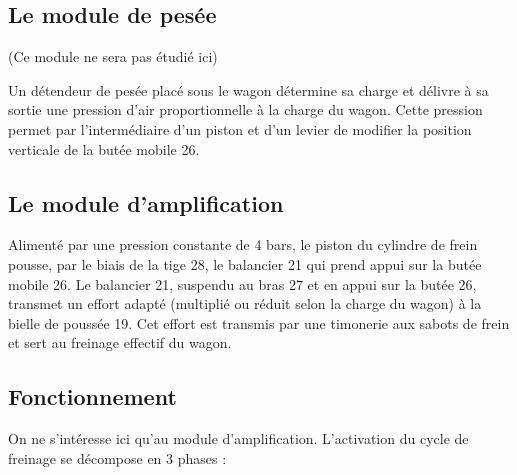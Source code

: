 \documentclass[11pt,oneside]{article}
\begin{document}
\subsection*{Le module de pesée}
(Ce module ne sera pas étudié ici)

Un détendeur de pesée placé sous le wagon détermine sa charge et délivre à sa sortie une pression d'air proportionnelle à la charge du wagon. Cette pression permet par l'intermédiaire d'un piston et d'un levier de modifier la position verticale de la butée mobile 26.

\subsection*{Le module d'amplification}
Alimenté par une pression constante de 4 bars, le piston du cylindre de frein pousse, par le biais de la tige 28, le balancier 21 qui prend appui sur la butée mobile 26. Le balancier 21, suspendu au bras 27 et en appui sur la butée 26, transmet un effort adapté (multiplié ou réduit selon la charge du wagon) à la bielle de poussée 19. Cet effort est transmis par une timonerie aux sabots de frein et sert au freinage effectif du wagon.
\subsection{Fonctionnement}
On ne s'intéresse ici qu'au module d'amplification.
L'activation du cycle de freinage se décompose en 3 phases :
\end{document}
